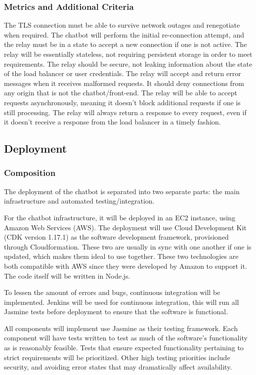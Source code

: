 \documentclass[onecolumn, draftclsnofoot,10pt, compsoc]{IEEEtran}
\begin{document}
\subsubsection{Metrics and Additional Criteria}
The TLS connection must be able to survive network outages and renegotiate when required.
The chatbot will perform the initial re-connection attempt, and the relay must be in a state to accept a new connection if one is not active.
The relay will be essentially stateless, not requiring persistent storage in order to meet requirements.
The relay should be secure, not leaking information about the state of the load balancer or user credentials.
The relay will accept and return error messages when it receives malformed requests.
It should deny connections from any origin that is not the chatbot/front-end.
The relay will be able to accept requests asynchronously, meaning it doesn't block additional requests if one is still processing.
The relay will always return a response to every request, even if it doesn't receive a response from the load balancer in a timely fashion.

\subsection{Deployment}
\subsubsection{Composition}
The deployment of the chatbot is separated into two separate parts: the main infrastructure and automated testing/integration. 

For the chatbot infrastructure, it will be deployed in an EC2 instance, using Amazon Web Services (AWS).
The deployment will use Cloud Development Kit (CDK version 1.17.1) as the software development framework, provisioned through Cloudformation\cite{cloudformation}.
These two are usually in sync with one another if one is updated, which makes them ideal to use together.
These two technologies are both compatible with AWS since they were developed by Amazon to support it.
The code itself will be written in Node.js.

To lessen the amount of errors and bugs, continuous integration will be implemented.
Jenkins\cite{jenkins} will be used for continuous integration, this will run all Jasmine tests before deployment to ensure that the software is functional.

All components will implement use Jasmine as their testing framework.
Each component will have tests written to test as much of the software's functionality as is reasonably feasible.
Tests that ensure expected functionality pertaining to strict requirements will be prioritized.
Other high testing priorities include security, and avoiding error states that may dramatically affect availability.
\end{document}
